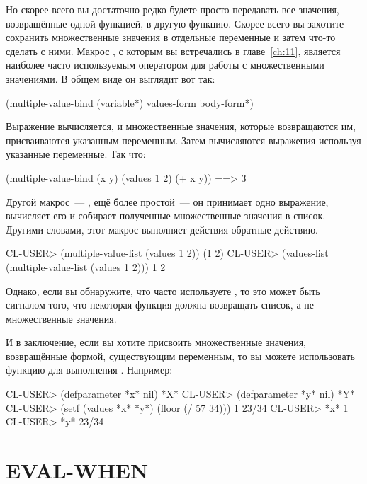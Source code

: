 Но скорее всего вы достаточно редко будете просто передавать все значения, возвращённые
одной функцией, в другую функцию.  Скорее всего вы захотите сохранить множественные
значения в отдельные переменные и затем что-то сделать с ними.  Макрос
, с которым вы встречались в главе~\ref{ch:11}, является
наиболее часто используемым оператором для работы с множественными значениями.  В общем
виде он выглядит вот так:

\begin{myverb}
(multiple-value-bind (variable*) values-form
  body-form*)
\end{myverb}

Выражение  вычисляется, и множественные значения, которые возвращаются
им, присваиваются указанным переменным.  Затем вычисляются выражения 
используя указанные переменные.  Так что:

\begin{myverb}
  (multiple-value-bind (x y) (values 1 2)
    (+ x y)) ==> 3
\end{myverb}

Другой макрос~--- , ещё более простой~--- он принимает одно
выражение, вычисляет его и собирает полученные множественные значения в список.  Другими
словами, этот макрос выполняет действия обратные действию.

\begin{myverb}
  CL-USER> (multiple-value-list (values 1 2))
  (1 2)
  CL-USER> (values-list (multiple-value-list (values 1 2)))
  1
  2
\end{myverb}

Однако, если вы обнаружите, что часто используете , то это может
быть сигналом того, что некоторая функция должна возвращать список, а не множественные
значения.

И в заключение, если вы хотите присвоить множественные значения, возвращённые формой,
существующим переменным, то вы можете использовать функцию  для выполнения
.  Например:

\begin{myverb}
  CL-USER> (defparameter *x* nil)
  *X*
  CL-USER> (defparameter *y* nil)
  *Y*
  CL-USER> (setf (values *x* *y*) (floor (/ 57 34)))
  1
  23/34
  CL-USER> *x*
  1
  CL-USER> *y*
  23/34
\end{myverb}

\section{EVAL-WHEN}

